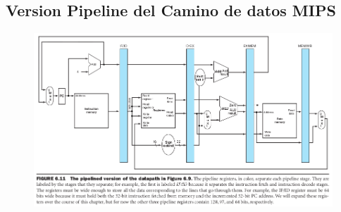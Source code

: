 \documentclass{article}
\begin{document}
\newpage
\subsection{Version Pipeline del Camino de datos MIPS}
\begin{figure}[h!]
    \includegraphics[width=\linewidth]{imagenes/pipeline/pipeline-datapath.png}
\end{figure}
\end{document}
